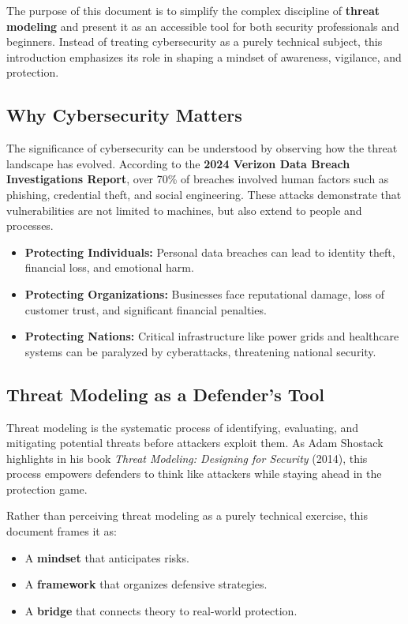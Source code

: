 \documentclass{article}
\begin{document}
The purpose of this document is to simplify the complex discipline of \textbf{threat modeling} and present it as an accessible tool for both security professionals and beginners. Instead of treating cybersecurity as a purely technical subject, this introduction emphasizes its role in shaping a mindset of awareness, vigilance, and protection.

\subsection{Why Cybersecurity Matters}
The significance of cybersecurity can be understood by observing how the threat landscape has evolved. According to the \textbf{2024 Verizon Data Breach Investigations Report}, over 70\% of breaches involved human factors such as phishing, credential theft, and social engineering. These attacks demonstrate that vulnerabilities are not limited to machines, but also extend to people and processes.

\begin{itemize}
    \item \textbf{Protecting Individuals:} Personal data breaches can lead to identity theft, financial loss, and emotional harm. 
    \item \textbf{Protecting Organizations:} Businesses face reputational damage, loss of customer trust, and significant financial penalties. 
    \item \textbf{Protecting Nations:} Critical infrastructure like power grids and healthcare systems can be paralyzed by cyberattacks, threatening national security.
\end{itemize}

\subsection{Threat Modeling as a Defender’s Tool}
Threat modeling is the systematic process of identifying, evaluating, and mitigating potential threats before attackers exploit them. As Adam Shostack highlights in his book \textit{Threat Modeling: Designing for Security} (2014), this process empowers defenders to think like attackers while staying ahead in the protection game.

Rather than perceiving threat modeling as a purely technical exercise, this document frames it as:
\begin{itemize}
    \item A \textbf{mindset} that anticipates risks. 
    \item A \textbf{framework} that organizes defensive strategies. 
    \item A \textbf{bridge} that connects theory to real-world protection.
\end{itemize}
\end{document}
